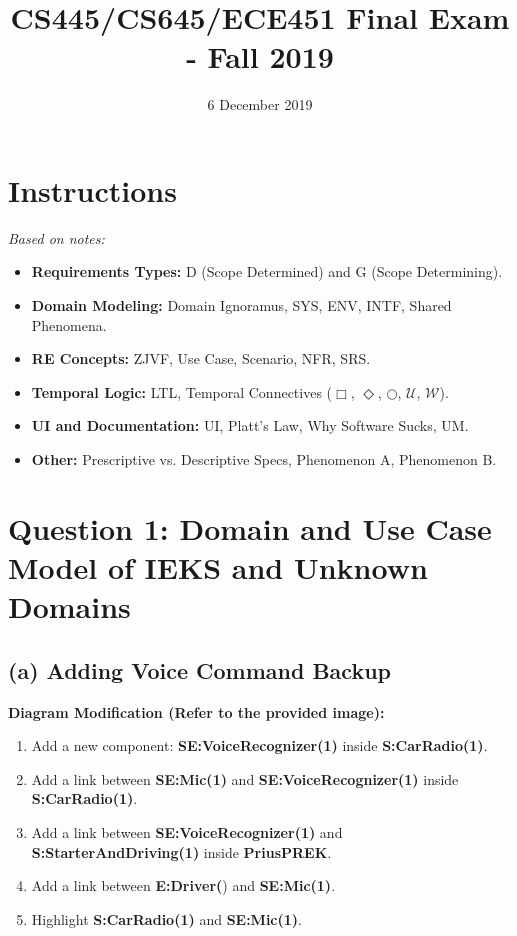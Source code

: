 \documentclass{article}
\title{CS445/CS645/ECE451 Final Exam - Fall 2019}
\date{6 December 2019}
\begin{document}
\maketitle

\section*{Instructions}
\textit{Based on notes:}
\begin{itemize}
    \item \textbf{Requirements Types:} D (Scope Determined) and G (Scope Determining).
    \item \textbf{Domain Modeling:} Domain Ignoramus, SYS, ENV, INTF, Shared Phenomena.
    \item \textbf{RE Concepts:} ZJVF, Use Case, Scenario, NFR, SRS.
    \item \textbf{Temporal Logic:} LTL, Temporal Connectives ($\Box$, $\Diamond$, $\bigcirc$, $\mathcal{U}$, $\mathcal{W}$).
    \item \textbf{UI and Documentation:} UI, Platt's Law, Why Software Sucks, UM.
    \item \textbf{Other:} Prescriptive vs. Descriptive Specs, Phenomenon A, Phenomenon B.
\end{itemize}

\section*{Question 1: Domain and Use Case Model of IEKS and Unknown Domains}

\subsection*{(a) Adding Voice Command Backup}

\textbf{Diagram Modification (Refer to the provided image):}
\begin{enumerate}
    \item Add a new component: \textbf{SE:VoiceRecognizer(1)} inside \textbf{S:CarRadio(1)}.
    \item Add a link between \textbf{SE:Mic(1)} and \textbf{SE:VoiceRecognizer(1)} inside \textbf{S:CarRadio(1)}.
    \item Add a link between \textbf{SE:VoiceRecognizer(1)} and \textbf{S:StarterAndDriving(1)} inside \textbf{PriusPREK}.
    \item Add a link between \textbf{E:Driver(}) and \textbf{SE:Mic(1)}.
    \item Highlight \textbf{S:CarRadio(1)} and \textbf{SE:Mic(1)}.
\end{enumerate}
\end{document}
